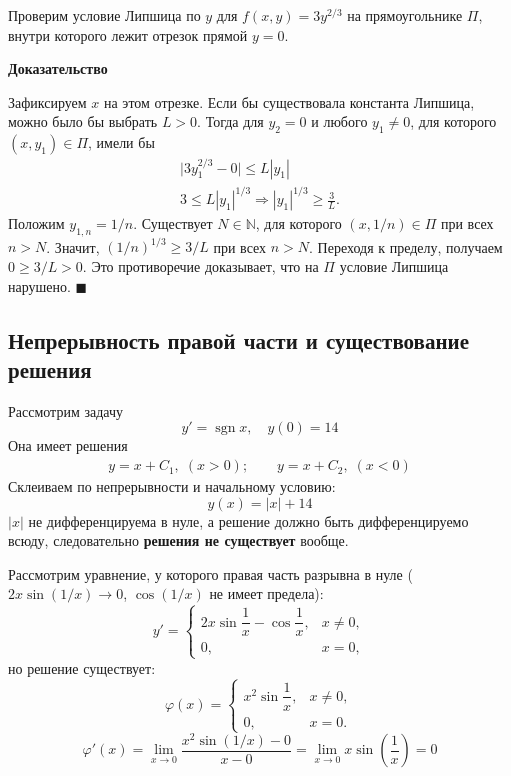 \documentclass[12pt,a4paper]{article}
\numberwithin{equation}{section}
\DeclareMathOperator{\sgn}{sgn}
\renewenvironment{proof}[1][Доказательство]{\begin{center}\textbf{#1}\end{center}}{\hfill$\blacksquare$\par}
\DeclareRobustCommand{\examtag}[1]{\space{\normalfont\small\color{HSEgray}(#1)}}
\begin{document}
Проверим условие Липшица по \(y\) для \(f(x,y)=3y^{2/3}\) на
прямоугольнике \(\Pi\), внутри которого лежит отрезок прямой \(y=0\).
\begin{center}
\end{center}
\begin{proof}
Зафиксируем \(x\) на этом отрезке. Если бы существовала константа
Липшица, можно было бы выбрать \(L>0\). Тогда для \(y_2=0\)
и любого \(y_1\ne0\), для которого \((x,y_1)\in\Pi\), имели бы
\begin{gather*}
\bigl|3y_1^{2/3}-0\bigr|\le L|y_1|\\
3\le L|y_1|^{1/3}\Longrightarrow |y_1|^{1/3}\ge\frac{3}{L}.
\end{gather*}
Положим \(y_{1,n}=1/n\). Существует \(N\in\mathbb N\), для которого
\((x,1/n)\in\Pi\) при всех \(n>N\). Значит, \((1/n)^{1/3}\ge 3/L\)
при всех \(n>N\). Переходя к пределу, получаем \(0\ge 3/L>0\).
Это противоречие доказывает, что на \(\Pi\) условие Липшица нарушено.
\end{proof}

\subsection{Непрерывность правой части и существование решения\examtag{вопрос~6}}

\begin{exampleHSE}
Рассмотрим задачу
\[y'=\sgn x,\quad y(0)=14\]
Она имеет решения
\begin{gather*}
y=x+C_1,\;(x>0);\qquad y=x+C_2,\;(x<0)
\end{gather*}
Склеиваем по непрерывности и начальному условию:
\[y(x)=|x|+14\]
\(|x|\) не дифференцируема в нуле, а решение должно быть дифференцируемо всюду, следовательно \textbf{решения не существует} вообще.
\end{exampleHSE}

\begin{exampleHSE}
Рассмотрим уравнение, у которого правая часть разрывна в нуле (\(2x\sin(1/x)\rightarrow0\), \(\cos(1/x)\) не имеет предела):
\[
y'=
\begin{cases}
 2x\sin\dfrac1x-\cos\dfrac1x,&x\neq0,\\
 0,&x=0,
\end{cases}
\]
но решение существует:
\[
\varphi(x)=
\begin{cases}
 x^2\sin\dfrac1x,&x\neq0,\\
 0,&x=0.
\end{cases}
\]
\[\varphi'(x)=\lim_{x\rightarrow0}\frac{x^2\sin(1/x)-0}{x-0}=\lim_{x\rightarrow0}x\sin\left(\frac{1}{x}\right)=0\]
\end{exampleHSE}
\end{document}
